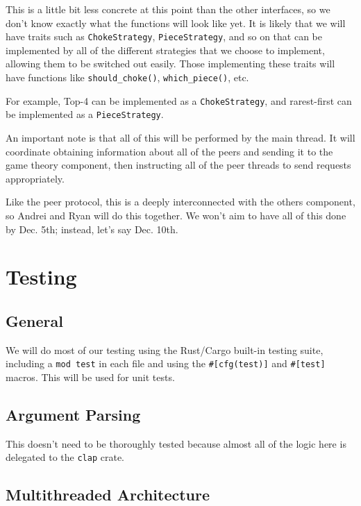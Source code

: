 \documentclass{article}
\begin{document}
    This is a little bit less concrete at this point than the other interfaces, so we don't know exactly what the functions will look like yet.
    It is likely that we will have traits such as \texttt{ChokeStrategy}, \texttt{PieceStrategy}, and so on that can be implemented by all of the different strategies that we choose to implement, allowing them to be switched out easily.
    Those implementing these traits will have functions like \texttt{should\_choke()}, \texttt{which\_piece()}, etc.

    For example, Top-4 can be implemented as a \texttt{ChokeStrategy}, and rarest-first can be implemented as a \texttt{PieceStrategy}.

    An important note is that all of this will be performed by the main thread.
    It will coordinate obtaining information about all of the peers and sending it to the game theory component, then instructing all of the peer threads to send requests appropriately.

    Like the peer protocol, this is a deeply interconnected with the others component, so Andrei and Ryan will do this together.
    We won't aim to have all of this done by Dec. 5th; instead, let's say Dec. 10th.

    \section{Testing}
    
    \subsection{General}

    We will do most of our testing using the Rust/Cargo built-in testing suite, including a \texttt{mod test} in each file and using the \texttt{\#[cfg(test)]} and \texttt{\#[test]} macros.
    This will be used for unit tests.

    \subsection{Argument Parsing}

    This doesn't need to be thoroughly tested because almost all of the logic here is delegated to the \texttt{clap} crate.

    \subsection{Multithreaded Architecture}
\end{document}
